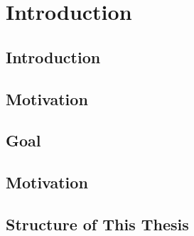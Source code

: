 \chapter{Introduction}
\label{ch:introduction}

\section{Introduction}
\section{Motivation}

\section{Goal}


\section{Motivation}


\section{Structure of This Thesis}
